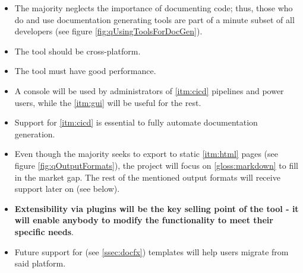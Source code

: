 \begin{itemize}
    \item The majority neglects the importance of documenting code; thus, those who do and use documentation generating tools are part of a minute subset of all developers (see figure \ref{fig:qUsingToolsForDocGen}).
    \item The tool should be cross-platform.
    \item The tool must have good performance.
    \item A console will be used by administrators of \ref{itm:cicd} pipelines and power users, while the \ref{itm:gui} will be useful for the rest.
    \item Support for \ref{itm:cicd} is essential to fully automate documentation generation.
    \item Even though the majority seeks to export to static \ref{itm:html} pages (see figure \ref{fig:qOutputFormats}), the project will focus on \ref{gloss:markdown} to fill in the market gap. The rest of the mentioned output formats will receive support later on (see below).
    \item \textbf{Extensibility via plugins will be the key selling point of the tool - it will enable anybody to modify the functionality to meet their specific needs}.
    \item Future support for  (see \ref{ssec:docfx}) templates will help users migrate from said platform.
\end{itemize}